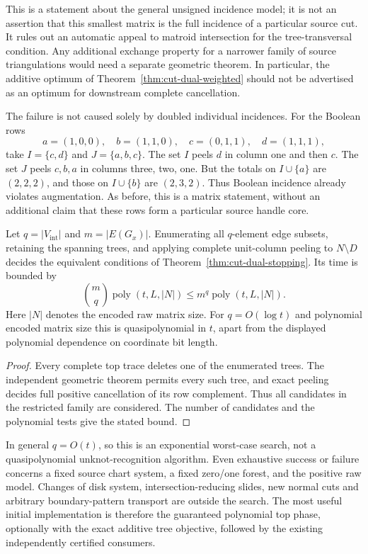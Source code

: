 This is a statement about the general unsigned incidence model; it is
not an assertion that this smallest matrix is the full incidence of a
particular source cut.  It rules out an automatic appeal to matroid
intersection for the tree-transversal condition.  Any additional
exchange property for a narrower family of source triangulations would
need a separate geometric theorem.  In particular, the additive optimum
of Theorem~\ref{thm:cut-dual-weighted} should not be advertised as an
optimum for downstream complete cancellation.

The failure is not caused solely by doubled individual incidences.
For the Boolean rows
\[
 a=(1,0,0),\quad b=(1,1,0),\quad
 c=(0,1,1),\quad d=(1,1,1),
\]
take $I=\{c,d\}$ and $J=\{a,b,c\}$.  The set $I$ peels $d$ in column
one and then $c$.  The set $J$ peels $c,b,a$ in columns three, two, one.
But the totals on $I\cup\{a\}$ are $(2,2,2)$, and those on
$I\cup\{b\}$ are $(2,3,2)$.  Thus Boolean incidence already violates
augmentation.  As before, this is a matrix statement, without an
additional claim that these rows form a particular source handle core.

\begin{proposition}
\label{prop:cut-dual-search}
Let $q=|V_{\mathrm{int}}|$ and $m=|E(G_x)|$.  Enumerating all $q$-element
edge subsets, retaining the spanning trees, and applying complete
unit-column peeling to $N\setminus D$ decides the equivalent conditions
of Theorem~\ref{thm:cut-dual-stopping}.  Its time is bounded by
\[
  \binom{m}{q}\operatorname{poly}(t,L,|N|)
  \le m^q\operatorname{poly}(t,L,|N|).
\]
Here $|N|$ denotes the encoded raw matrix size.  For $q=O(\log t)$ and
polynomial encoded matrix size this is quasipolynomial in $t$, apart
from the displayed polynomial dependence on coordinate bit length.
\end{proposition}

\begin{proof}
Every complete top trace deletes one of the enumerated trees.  The
independent geometric theorem permits every such tree, and exact
peeling decides full positive cancellation of its row complement.
Thus all candidates in the restricted family are considered.  The
number of candidates and the polynomial tests give the stated bound.
\end{proof}

In general $q=O(t)$, so this is an exponential worst-case search, not a
quasipolynomial unknot-recognition algorithm.  Even exhaustive success or
failure concerns a fixed source chart system, a fixed zero/one forest,
and the positive raw model.  Changes of disk system, intersection-reducing
slides, new normal cuts and arbitrary boundary-pattern transport are
outside the search.  The most useful initial implementation is therefore
the guaranteed polynomial top phase, optionally with the exact additive
tree objective, followed by the existing independently certified consumers.
